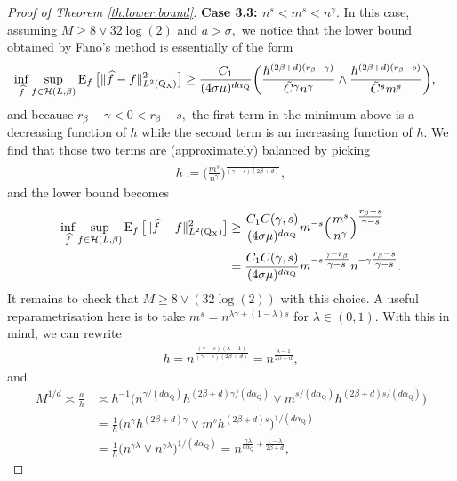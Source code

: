 \documentclass[10pt]{article}
\newcommand{\mH}{\mathcal{H}}
\newcommand{\E}{\operatorname{E}}
\newcommand{\Q}{\operatorname{Q}}
\newcommand{\wh}{\widehat}
\newcommand{\sX}{\mathrm{X}}
\begin{document}
\begin{proof}[Proof of Theorem \ref{th.lower.bound}]
    \noindent\textbf{Case 3.3: $n^s < m^s < n^\gamma.$} In this case, assuming $M \geq 8\vee 32\log(2)$ and $a > \sigma,$ we notice that the lower bound obtained by Fano's method is essentially of the form
    \begin{align}
        \label{eq.3.3}
        \inf_{\wh f} \sup_{f \in \mH(L, \beta)}\E_{f}\big[\|\wh f - f\|_{L^2(\Q\mathstrut_{\!\sX})}^2\big] &\geq \frac{C_1}{(4\sigma\mu)^{d\alpha_{\Q}}}\bigg(\frac{h^{(2\beta + d)(r_\beta - \gamma)}}{\tilde C^{\gamma}n^{\gamma}} \wedge \frac{h^{(2\beta + d)(r_\beta - s)}}{\tilde C^s m^s}\bigg),
    \end{align}
    and because $r_\beta - \gamma < 0 < r_\beta - s,$ the first term in the minimum above is a decreasing function of $h$ while the second term is an increasing function of $h.$ We find that those two terms are (approximately) balanced by picking 
    \begin{align*}
        h := \Big(\frac{m^s}{n^\gamma}\Big)^{\tfrac{1}{(\gamma - s)(2\beta + d)}},
    \end{align*}
    and the lower bound becomes
    \begin{align*}
        \inf_{\wh f} \sup_{f \in \mH(L, \beta)}\E_{f}\big[\|\wh f - f\|_{L^2(\Q\mathstrut_{\!\sX})}^2\big] &\geq \frac{C_1 C(\gamma, s)}{(4\sigma\mu)^{d\alpha_{\Q}}}m^{-s}\Big(\frac{m^s}{n^\gamma}\Big)^{\tfrac{r_\beta - s}{\gamma - s}}\\
        &= \frac{C_1 C(\gamma, s)}{(4\sigma\mu)^{d\alpha_{\Q}}}m^{-s\tfrac{\gamma - r_\beta}{\gamma - s}}n^{-\gamma\tfrac{r_\beta - s}{\gamma - s}}.
    \end{align*}
    It remains to check that $M \geq 8\vee (32\log(2))$ with this choice. A useful reparametrisation here is to take $m^s = n^{\lambda \gamma + (1 - \lambda)s}$ for $\lambda \in (0, 1).$ With this in mind, we can rewrite
    \begin{align*}
        h = n^{\tfrac{(\gamma - s)(\lambda - 1)}{(\gamma - s)(2\beta + d)}} = n^{\tfrac{\lambda - 1}{2\beta + d}},
    \end{align*}
    and
    \begin{align*}
        M^{1/d} \asymp \frac{a}{h} &\asymp h^{-1} \Big(n^{\gamma/(d\alpha_{\Q})}h^{(2\beta + d)\gamma/(d\alpha_{\Q})} \vee m^{s/(d\alpha_{\Q})}h^{(2\beta + d)s/(d\alpha_{\Q})}\Big)\\
        &= \frac 1h\Big(n^{\gamma}h^{(2\beta + d)\gamma} \vee m^{s}h^{(2\beta + d)s}\Big)^{1/(d\alpha_{\Q})}\\
        &= \frac 1h\big(n^{\gamma\lambda} \vee n^{\gamma\lambda}\big)^{1/(d\alpha_{\Q})} = n^{\tfrac{\gamma\lambda}{d\alpha_{\Q}} + \tfrac{1 - \lambda}{2\beta + d}},

\end{align*}
\end{proof}
\end{document}
